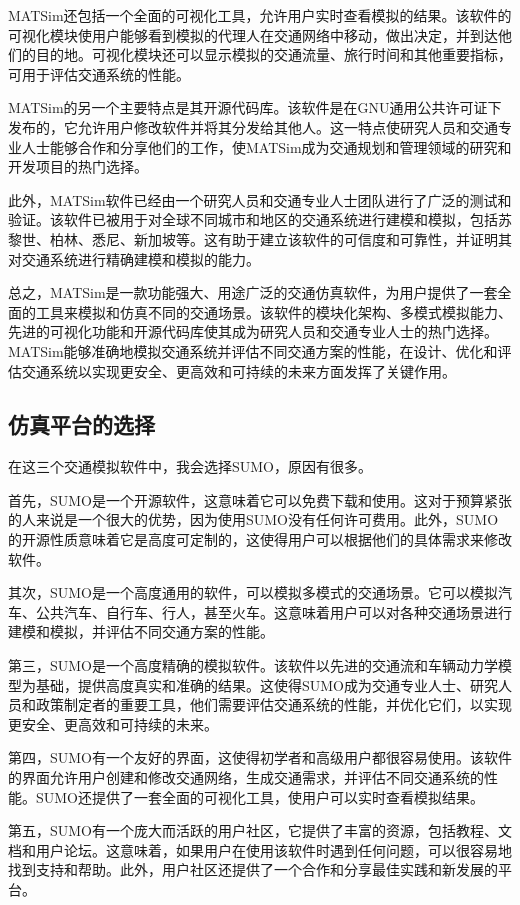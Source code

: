 MATSim还包括一个全面的可视化工具，允许用户实时查看模拟的结果。该软件的可视化模块使用户能够看到模拟的代理人在交通网络中移动，做出决定，并到达他们的目的地。可视化模块还可以显示模拟的交通流量、旅行时间和其他重要指标，可用于评估交通系统的性能。

MATSim的另一个主要特点是其开源代码库。该软件是在GNU通用公共许可证下发布的，它允许用户修改软件并将其分发给其他人。这一特点使研究人员和交通专业人士能够合作和分享他们的工作，使MATSim成为交通规划和管理领域的研究和开发项目的热门选择。

此外，MATSim软件已经由一个研究人员和交通专业人士团队进行了广泛的测试和验证。该软件已被用于对全球不同城市和地区的交通系统进行建模和模拟，包括苏黎世、柏林、悉尼、新加坡等。这有助于建立该软件的可信度和可靠性，并证明其对交通系统进行精确建模和模拟的能力。

总之，MATSim是一款功能强大、用途广泛的交通仿真软件，为用户提供了一套全面的工具来模拟和仿真不同的交通场景。该软件的模块化架构、多模式模拟能力、先进的可视化功能和开源代码库使其成为研究人员和交通专业人士的热门选择。MATSim能够准确地模拟交通系统并评估不同交通方案的性能，在设计、优化和评估交通系统以实现更安全、更高效和可持续的未来方面发挥了关键作用。


\subsection{仿真平台的选择}

在这三个交通模拟软件中，我会选择SUMO，原因有很多。

首先，SUMO是一个开源软件，这意味着它可以免费下载和使用。这对于预算紧张的人来说是一个很大的优势，因为使用SUMO没有任何许可费用。此外，SUMO的开源性质意味着它是高度可定制的，这使得用户可以根据他们的具体需求来修改软件。

其次，SUMO是一个高度通用的软件，可以模拟多模式的交通场景。它可以模拟汽车、公共汽车、自行车、行人，甚至火车。这意味着用户可以对各种交通场景进行建模和模拟，并评估不同交通方案的性能。

第三，SUMO是一个高度精确的模拟软件。该软件以先进的交通流和车辆动力学模型为基础，提供高度真实和准确的结果。这使得SUMO成为交通专业人士、研究人员和政策制定者的重要工具，他们需要评估交通系统的性能，并优化它们，以实现更安全、更高效和可持续的未来。

第四，SUMO有一个友好的界面，这使得初学者和高级用户都很容易使用。该软件的界面允许用户创建和修改交通网络，生成交通需求，并评估不同交通系统的性能。SUMO还提供了一套全面的可视化工具，使用户可以实时查看模拟结果。

第五，SUMO有一个庞大而活跃的用户社区，它提供了丰富的资源，包括教程、文档和用户论坛。这意味着，如果用户在使用该软件时遇到任何问题，可以很容易地找到支持和帮助。此外，用户社区还提供了一个合作和分享最佳实践和新发展的平台。

